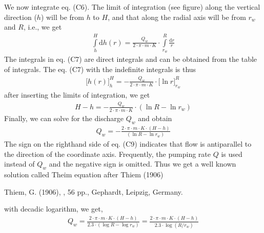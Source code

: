 \documentclass[letterpaper,10pt,english]{jupyterBook}
\begin{document}
\sphinxAtStartPar
We now integrate eq. (C6). The limit of integration (see figure) along the vertical direction (\(h\)) will be from \(h\) to \(H\), and that along the radial axis will be from \(r_w\) and \(R\), i.e., we get
\begin{equation*}
\begin{split}
\int\limits_h^H\textrm{d}h(r) = \frac{Q_w}{2\cdot \pi \cdot m \cdot K }\cdot \int\limits_{r_w}^R\frac{\textrm{d}r}{r} \tag{C7}
\end{split}
\end{equation*}
\sphinxAtStartPar
The integrals in eq. (C7) are direct integrals and can be obtained from the table of integrals. The eq. (C7) with the indefinite integrals is thus
\begin{equation*}
\begin{split}
\big[h(r)\big]_h^H = - \frac{Q_w}{2\cdot\pi\cdot m \cdot K}\cdot \big[\ln r\big]_{r_w}^R 
\end{split}
\end{equation*}
\sphinxAtStartPar
after inserting the limits of integration, we get
\begin{equation*}
\begin{split}
H - h = - \frac{Q_w}{2\cdot\pi\cdot m \cdot K}\cdot (\ln R - \ln r_w) \tag{C8}
\end{split}
\end{equation*}
\sphinxAtStartPar
Finally, we can solve for the discharge \(Q_w\) and obtain
\begin{equation*}
\begin{split}
Q_w = - \frac{2\cdot\pi\cdot m \cdot K \cdot (H-h)}{(\ln R - \ln r_w)}\tag{C9}
\end{split}
\end{equation*}
\sphinxAtStartPar
The  sign on the right\sphinxhyphen{}hand side of eq. (C9) indicates that flow is anti\sphinxhyphen{}parallel to the direction of the coordinate axis. Frequently, the pumping rate \(Q\) is used instead of \(Q_w\) and the negative sign is omitted. Thus we get a well known solution called Theim equation after Thiem (1906)%
\begin{footnote}[1]\sphinxAtStartFootnote
Thiem, G. (1906), , 56 pp., Gephardt, Leipzig, Germany.
%
\end{footnote}

\sphinxAtStartPar
with decadic logarithm, we get,
\begin{equation*}
\begin{split}
Q_w = \frac{2\cdot\pi\cdot m \cdot K \cdot (H-h)}{2.3\cdot(\log R - \log r_w)}  =  \frac{2\cdot\pi\cdot m \cdot K \cdot (H-h)}{2.3 \cdot\log (R/r_w)}
\end{split}
\end{equation*}
\end{document}
